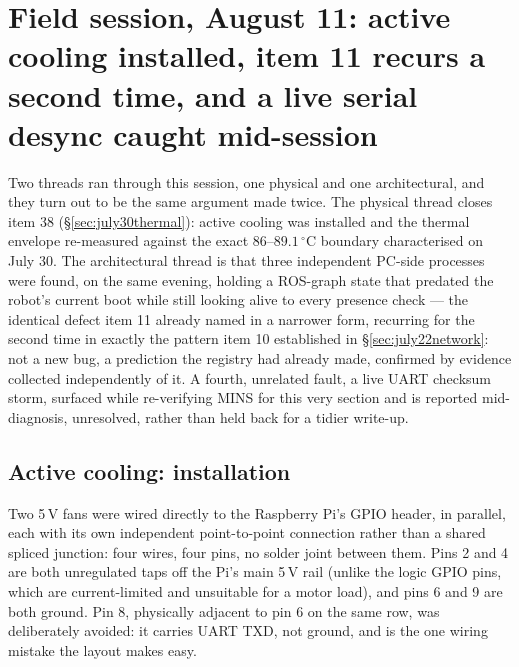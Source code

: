 \section{Field session, August 11: active cooling installed, item 11 recurs
a second time, and a live serial desync caught mid-session}
\label{sec:aug11}

Two threads ran through this session, one physical and one architectural,
and they turn out to be the same argument made twice. The physical thread
closes item 38 (\S\ref{sec:july30thermal}): active cooling was installed and
the thermal envelope re-measured against the exact $86$--$89.1\,^\circ$C
boundary characterised on July 30. The architectural thread is that three
independent PC-side processes were found, on the same evening, holding a
ROS-graph state that predated the robot's current boot while still looking
alive to every presence check --- the identical defect item 11 already named
in a narrower form, recurring for the second time in exactly the pattern
item 10 established in \S\ref{sec:july22network}: not a new bug, a
prediction the registry had already made, confirmed by evidence collected
independently of it. A fourth, unrelated fault, a live UART checksum storm,
surfaced while re-verifying MINS for this very section and is reported
mid-diagnosis, unresolved, rather than held back for a tidier write-up.

\subsection{Active cooling: installation}
\label{sec:aug11fans}

Two 5\,V fans were wired directly to the Raspberry Pi's GPIO header, in
parallel, each with its own independent point-to-point connection rather
than a shared spliced junction: four wires, four pins, no solder joint
between them. Pins 2 and 4 are both unregulated taps off the Pi's main
5\,V rail (unlike the logic GPIO pins, which are current-limited and
unsuitable for a motor load), and pins 6 and 9 are both ground. Pin 8,
physically adjacent to pin 6 on the same row, was deliberately avoided: it
carries UART TXD, not ground, and is the one wiring mistake the layout makes
easy.


